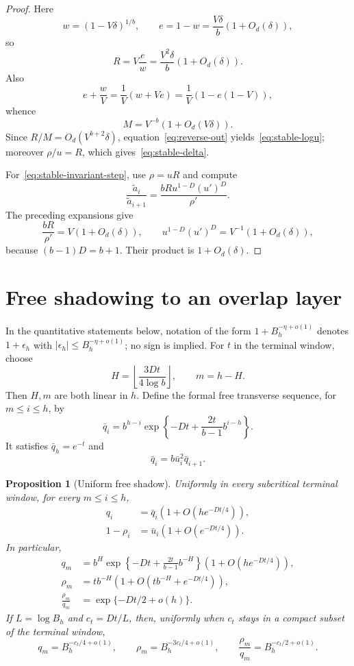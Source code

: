 \documentclass[11pt]{amsart}
\newtheorem{proposition}[theorem]{Proposition}
\theoremstyle{definition}
\begin{document}
\begin{proof}
Here
\[
 w=(1-V\delta)^{1/b},
 \qquad
 e=1-w=\frac{V\delta}{b}(1+O_d(\delta)),
\]
so
\[
 R=V\frac ew=\frac{V^2\delta}{b}(1+O_d(\delta)).
\]
Also
\[
 e+\frac wV
 =\frac1V\left(w+Ve\right)
 =\frac1V\left(1-e(1-V)\right),
\]
whence
\[
 M=V^{-b}(1+O_d(V\delta)).
\]
Since $R/M=O_d(V^{b+2}\delta)$, equation~\eqref{eq:reverse-out} yields~\eqref{eq:stable-logu}; moreover $\rho/u=R$, which gives~\eqref{eq:stable-delta}.

For~\eqref{eq:stable-invariant-step}, use $\rho=uR$ and compute
\[
 \frac{\widetilde a_i}{\widetilde a_{i+1}}
 =\frac{bRu^{1-D}(u')^D}{\rho'}.
\]
The preceding expansions give
\[
 \frac{bR}{\rho'}=V(1+O_d(\delta)),
 \qquad
 u^{1-D}(u')^D=V^{-1}(1+O_d(\delta)),
\]
because $(b-1)D=b+1$.  Their product is $1+O_d(\delta)$.
\end{proof}


\section{Free shadowing to an overlap layer}
In the quantitative statements below, notation of the form
$1+B_h^{-\eta+o(1)}$ denotes $1+\epsilon_h$ with
$|\epsilon_h|\le B_h^{-\eta+o(1)}$; no sign is implied.
For $t$ in the terminal window, choose
\begin{equation}\label{eq:H-choice}
 H=\left\lfloor\frac{3Dt}{4\log b}\right\rfloor,
 \qquad
 m=h-H.
\end{equation}
Then $H,m$ are both linear in $h$.  Define the formal free transverse sequence, for $m\le i\le h$, by
\begin{equation}\label{eq:qbar}
 \bar q_i
 =b^{h-i}
 \exp\left\{-Dt+\frac{2t}{b-1}b^{i-h}\right\}.
\end{equation}
It satisfies $\bar q_h=e^{-t}$ and
\[
 \bar q_i=b\bar u_i^2\bar q_{i+1}.
\]

\begin{proposition}[Uniform free shadow]\label{prop:free-shadow}
Uniformly in every subcritical terminal window, for every $m\le i\le h$,
\begin{align}
 q_i&=\bar q_i\left(1+O\!\left(h e^{-Dt/4}\right)\right),\label{eq:q-shadow}\\
 1-\rho_i&=\bar u_i\left(1+O\!\left(e^{-Dt/4}\right)\right).\label{eq:rho-shadow}
\end{align}
In particular,
\begin{align}
 q_m&=b^H\exp\left\{-Dt+\frac{2t}{b-1}b^{-H}\right\}
 \left(1+O\!\left(h e^{-Dt/4}\right)\right),\label{eq:qm}\\
 \rho_m&=t b^{-H}
 \left(1+O\!\left(t b^{-H}+e^{-Dt/4}\right)\right),\label{eq:rhom}\\
 \frac{\rho_m}{q_m}&=\exp\{-Dt/2+o(h)\}.\label{eq:rho-over-q}
\end{align}
If $L=\log B_h$ and $c_t=Dt/L$, then, uniformly when $c_t$ stays in a compact subset of the terminal window,
\begin{equation}\label{eq:overlap-scales-quantitative}
 q_m=B_h^{-c_t/4+o(1)},\qquad
 \rho_m=B_h^{-3c_t/4+o(1)},\qquad
 \frac{\rho_m}{q_m}=B_h^{-c_t/2+o(1)}.
\end{equation}
\end{proposition}
\end{document}
